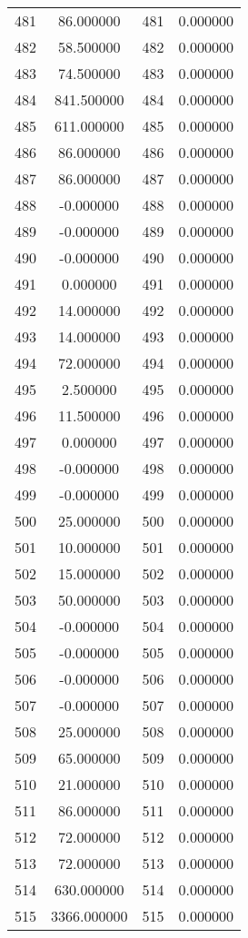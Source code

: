 \documentclass[12pt]{article}
\begin{document}
\begin{longtable}{@{}cccc@{}}
481 & 86.000000 & 481 & 0.000000 \\
482 & 58.500000 & 482 & 0.000000 \\
483 & 74.500000 & 483 & 0.000000 \\
484 & 841.500000 & 484 & 0.000000 \\
485 & 611.000000 & 485 & 0.000000 \\
486 & 86.000000 & 486 & 0.000000 \\
487 & 86.000000 & 487 & 0.000000 \\
488 & -0.000000 & 488 & 0.000000 \\
489 & -0.000000 & 489 & 0.000000 \\
490 & -0.000000 & 490 & 0.000000 \\
491 & 0.000000 & 491 & 0.000000 \\
492 & 14.000000 & 492 & 0.000000 \\
493 & 14.000000 & 493 & 0.000000 \\
494 & 72.000000 & 494 & 0.000000 \\
495 & 2.500000 & 495 & 0.000000 \\
496 & 11.500000 & 496 & 0.000000 \\
497 & 0.000000 & 497 & 0.000000 \\
498 & -0.000000 & 498 & 0.000000 \\
499 & -0.000000 & 499 & 0.000000 \\
500 & 25.000000 & 500 & 0.000000 \\
501 & 10.000000 & 501 & 0.000000 \\
502 & 15.000000 & 502 & 0.000000 \\
503 & 50.000000 & 503 & 0.000000 \\
504 & -0.000000 & 504 & 0.000000 \\
505 & -0.000000 & 505 & 0.000000 \\
506 & -0.000000 & 506 & 0.000000 \\
507 & -0.000000 & 507 & 0.000000 \\
508 & 25.000000 & 508 & 0.000000 \\
509 & 65.000000 & 509 & 0.000000 \\
510 & 21.000000 & 510 & 0.000000 \\
511 & 86.000000 & 511 & 0.000000 \\
512 & 72.000000 & 512 & 0.000000 \\
513 & 72.000000 & 513 & 0.000000 \\
514 & 630.000000 & 514 & 0.000000 \\
515 & 3366.000000 & 515 & 0.000000 \\

\end{longtable}
\end{document}
